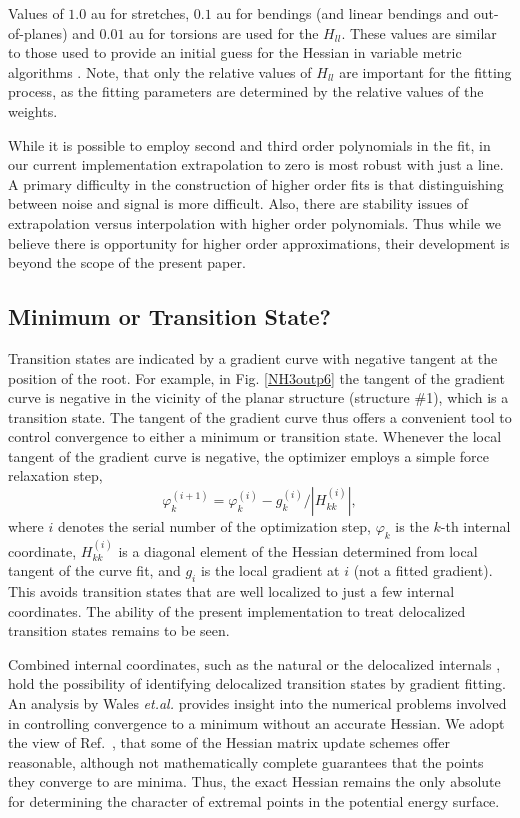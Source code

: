 \documentclass[prl,aps,preprint,superbib,12pt]{revtex4}
\begin{document}
Values of $1.0$ au for stretches, $0.1$ au for bendings (and linear bendings and out-of-planes) and $0.01$ au
for torsions are used for the $H_{ll}$.  These values are similar to those used to provide 
an initial guess for the Hessian in variable metric algorithms \cite{VBakken02}.  Note, that only the relative 
values of $H_{ll}$ are important for the fitting process, as the fitting parameters are determined by the 
relative values of the weights.  

While it is possible to employ second and third order polynomials in the fit, in our 
current implementation extrapolation to zero is most robust with just a line.  
A primary difficulty in the construction of higher order fits is that distinguishing 
between noise and signal is more difficult.  Also, there are stability 
issues of extrapolation versus interpolation with higher order polynomials.
Thus while we believe there is opportunity for higher order approximations,  
their development is beyond the scope of the present paper.  

\subsection{Minimum or Transition State?}

Transition states are indicated by a gradient curve with  negative tangent at the position
of the root.  For example, in Fig. \ref{NH3outp6} the tangent of the gradient curve is negative 
in the vicinity of the planar structure (structure \#1), which is a transition state. The tangent 
of the gradient curve thus offers a convenient tool to control convergence to either a minimum 
or transition state.  Whenever the local tangent of the gradient curve is negative, the optimizer 
employs a simple force relaxation step,
\begin{equation}
\label{tseq}
\varphi_{k}^{(i+1)} = \varphi_{k}^{(i)} -g_{k}^{(i)}/|H_{kk}^{(i)}| ,
\end{equation}
where $i$ denotes the serial number of the optimization step,  $\varphi_{k}$ is the $k$-th internal coordinate,
 $H^{(i)}_{kk}$ is a diagonal element of the Hessian determined from local tangent of the curve fit, and
$g_i$ is the local gradient at $i$ (not a fitted gradient).
This avoids transition states that are well localized to just a few internal coordinates.
The ability of the present implementation to treat delocalized transition states
remains to be seen. 

Combined internal coordinates, such as the natural \cite{GFogarasi92,MvonArnim99} or the
delocalized internals \cite{JBaker96}, hold the possibility of identifying delocalized transition 
states by gradient fitting.  An analysis by  Wales {\it et.al.} \cite{JUppenbrink92} provides 
insight into the numerical problems involved in controlling convergence to a minimum without an 
accurate Hessian.  
We adopt the view of Ref.~, that
some of the 
Hessian matrix update schemes offer reasonable, although not mathematically
complete guarantees that the points they converge to are minima.
Thus, the exact Hessian remains the only 
absolute for determining the character of extremal points in the potential energy 
surface.
\end{document}
